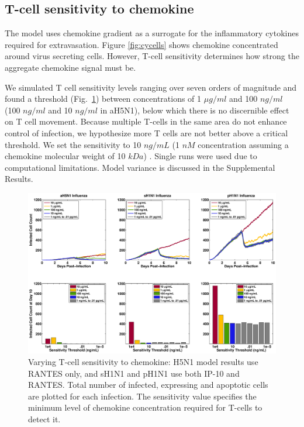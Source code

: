 \documentclass[10pt]{article}
\begin{document}
\subsection*{T-cell sensitivity to chemokine}

The model uses chemokine gradient as a surrogate for the inflammatory cytokines required for extravasation.  Figure \ref{fig:cycells} shows chemokine concentrated around virus secreting cells.  However, T-cell sensitivity determines how strong the aggregate chemokine signal must be.

We simulated T cell sensitivity levels ranging over seven orders of magnitude and found a threshold (Fig.~\ref{fig:sensitivity}) between concentrations of 1 $\mu g/ml$ and 100 $ng/ml$ (100 $ng/ml$ and 10 $ng/ml$ in aH5N1), below which there is no discernible effect on T cell movement.  Because multiple T-cells in the same area do not enhance control of infection, we hypothesize more T cells are not better above a critical threshold.  We set the sensitivity to 10 $ng/mL$ (1 $nM$ concentration assuming a chemokine molecular weight of 10 $kDa$) \cite{Gao2003}.  Single runs were used due to computational limitations.  Model variance is discussed in the Supplemental Results.

\begin{figure}[ht!]
\begin{center}
 \includegraphics[width=\textwidth]{sensitivity}
 \end{center}
\caption{Varying T-cell sensitivity to chemokine: H5N1 model results use RANTES  only, and sH1N1 and pH1N1 use both IP-10 and RANTES. Total number of infected, expressing and apoptotic cells are plotted for each infection.  The sensitivity value specifies the minimum level of chemokine concentration required for T-cells to detect it. } 
 \label{fig:sensitivity}
\end{figure}
\end{document}
